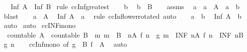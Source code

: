\begin{isabellebody}
\ \ \ {\isachardoublequoteopen}Inf\ A\ {\isasymle}\ Inf\ B{\isachardoublequoteclose}\isanewline
%
\isadelimproof
%
\endisadelimproof
%
\isatagproof
{}\isamarkupfalse%
\ {\isacharparenleft}rule\ ccInf{\isacharunderscore}greatest{\isacharparenright}\isanewline
\ \ \isamarkupfalse%
\ b\ \isamarkupfalse%
\ {\isachardoublequoteopen}b\ {\isasymin}\ B{\isachardoublequoteclose}\isanewline
\ \ \isamarkupfalse%
\ assms\ \isamarkupfalse%
\ a\ \ {\isachardoublequoteopen}a\ {\isasymin}\ A{\isachardoublequoteclose}\ \ {\isachardoublequoteopen}a\ {\isasymle}\ b{\isachardoublequoteclose}\ \isamarkupfalse%
\ blast\isanewline
\ \ \isamarkupfalse%
\ {\isacartoucheopen}a\ {\isasymin}\ A{\isacartoucheclose}\ \isamarkupfalse%
\ {\isachardoublequoteopen}Inf\ A\ {\isasymle}\ a{\isachardoublequoteclose}\ \isamarkupfalse%
\ {\isacharparenleft}rule\ ccInf{\isacharunderscore}lower{\isacharbrackleft}rotated{\isacharbrackright}{\isacharparenright}\ auto\isanewline
\ \ \isamarkupfalse%
\ {\isacartoucheopen}a\ {\isasymle}\ b{\isacartoucheclose}\ \isamarkupfalse%
\ {\isachardoublequoteopen}Inf\ A\ {\isasymle}\ b{\isachardoublequoteclose}\ \isamarkupfalse%
\ auto\isanewline
{}\isamarkupfalse%
\ auto%
\endisatagproof
{\isafoldproof}%
%
\isadelimproof
\isanewline
%
\endisadelimproof
\isanewline
{}\isamarkupfalse%
\ ccINF{\isacharunderscore}mono{\isacharcolon}\isanewline
\ \ {\isachardoublequoteopen}countable\ A\ {\isasymLongrightarrow}\ countable\ B\ {\isasymLongrightarrow}\ {\isacharparenleft}{\isasymAnd}m{\isachardot}\ m\ {\isasymin}\ B\ {\isasymLongrightarrow}\ {\isasymexists}n{\isasymin}A{\isachardot}\ f\ n\ {\isasymle}\ g\ m{\isacharparenright}\ {\isasymLongrightarrow}\ {\isacharparenleft}INF\ n{\isacharcolon}A{\isachardot}\ f\ n{\isacharparenright}\ {\isasymle}\ {\isacharparenleft}INF\ n{\isacharcolon}B{\isachardot}\ g\ n{\isacharparenright}{\isachardoublequoteclose}\isanewline
%
\isadelimproof
\ \ %
\endisadelimproof
%
\isatagproof
{}\isamarkupfalse%
\ ccInf{\isacharunderscore}mono\ {\isacharbrackleft}of\ {\isachardoublequoteopen}g\ {\isacharbackquote}\ B{\isachardoublequoteclose}\ {\isachardoublequoteopen}f\ {\isacharbackquote}\ A{\isachardoublequoteclose}{\isacharbrackright}\ \isamarkupfalse%
\ auto%
\endisatagproof
{\isafoldproof}%
%
\isadelimproof
\isanewline
%
\endisadelimproof

\end{isabellebody}
